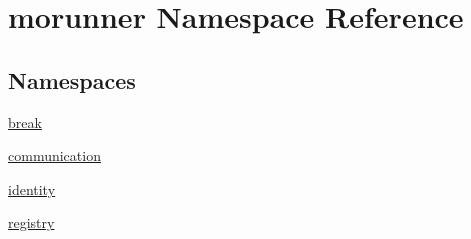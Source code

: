 \hypertarget{namespacemorunner}{}\section{morunner Namespace Reference}
\label{namespacemorunner}
\subsection*{Namespaces}
\begin{DoxyCompactItemize}
\item 
 \hyperlink{namespacemorunner_1_1break}{break}
\item 
 \hyperlink{namespacemorunner_1_1communication}{communication}
\item 
 \hyperlink{namespacemorunner_1_1identity}{identity}
\item 
 \hyperlink{namespacemorunner_1_1registry}{registry}
\end{DoxyCompactItemize}
